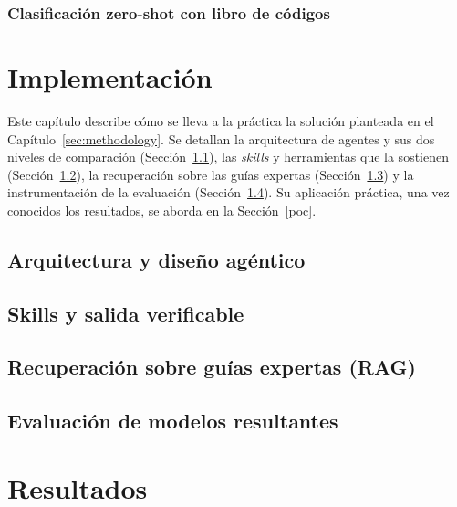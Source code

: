 \documentclass[12pt]{report} %
\renewcommand{\_}{\origunderscore\allowbreak}
\begin{document}
\subsection{Clasificación zero-shot con libro de códigos}
\label{zero_shot}




\chapter{Implementación}
\label{implementation}
Este capítulo describe cómo se lleva a la práctica la solución planteada en el
Capítulo~\ref{sec:methodology}. Se detallan la arquitectura de agentes y sus dos
niveles de comparación (Sección~\ref{agents}), las \textit{skills} y herramientas
que la sostienen (Sección~\ref{prompts}), la recuperación sobre las guías
expertas (Sección~\ref{rag}) y la instrumentación de la evaluación
(Sección~\ref{eval}). Su aplicación práctica, una vez conocidos los resultados,
se aborda en la Sección~\ref{poc}.


\section{Arquitectura y diseño agéntico}
\label{agents}


\section{Skills y salida verificable}
\label{prompts}


\section{Recuperación sobre guías expertas (RAG)}
\label{rag}


\section{Evaluación de modelos resultantes}
\label{eval}










\chapter{Resultados}
\label{results_and_discussion}
\label{sec:iris_experimentacion}

\end{document}
